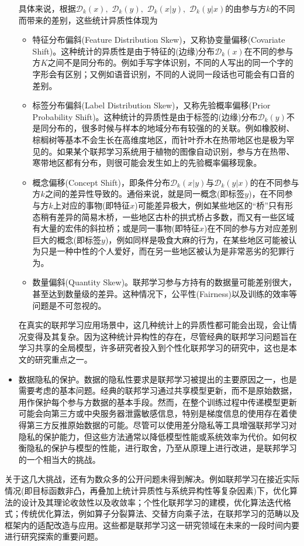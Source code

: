 \begin{itemize}
具体来说，根据$\mathcal{D}_k(x),$ $\mathcal{D}_k(y),$ $\mathcal{D}_k(x | y),$ $\mathcal{D}_k(y | x)$的由参与方$k$的不同而带来的差别，这些统计异质性体现为
\begin{itemize}
    \item 特征分布偏斜(Feature Distribution Skew)，又称协变量偏移(Covariate Shift)。这种统计的异质性是由于特征的(边缘)分布$\mathcal{D}_k(x)$在不同的参与方$K$之间不是同分布的。例如手写字体识别，不同的人写出的同一个字的字形会有区别；又例如语音识别，不同的人说同一段话也可能会有口音的差别。
    \item 标签分布偏斜(Label Distribution Skew)，又称先验概率偏移(Prior Probability Shift)。这种统计的异质性是由于标签的(边缘)分布$\mathcal{D}_k(y)$不是同分布的，很多时候与样本的地域分布有较强的的关联。例如橡胶树、棕榈树等基本不会生长在高维度地区，而针叶乔木在热带地区也是极为罕见的。如果某个联邦学习系统用于植物的图像自动识别，参与方在热带、寒带地区都有分布，则很可能会发生如上的先验概率偏移现象。
    \item 概念偏移(Concept Shift)，即条件分布$\mathcal{D}_k(x | y)$与$\mathcal{D}_k(y | x)$的在不同参与方$k$之间的差异性导致的。通俗来说，就是同一概念(即标签$y$)，在不同参与方$k$上对应的事物(即特征$x$)可能差异极大，例如某些地区的``桥''只有形态稍有差异的简易木桥，一些地区古朴的拱式桥占多数，而又有一些区域有大量的宏伟的斜拉桥；或是同一事物(即特征$x$)在不同的参与方对应差别巨大的概念(即标签$y$)，例如同样是吸食大麻的行为，在某些地区可能被认为只是一种中性的个人爱好，而在另一些地区被认为是非常恶劣的犯罪行为。
    \item 数量偏斜(Quantity Skew)。联邦学习参与方持有的数据量可能差别很大，甚至达到数量级的差异。这种情况下，公平性(Fairness)以及训练的效率等问题是不可忽视的。
\end{itemize}
在真实的联邦学习应用场景中，这几种统计上的异质性都可能会出现，会让情况变得及其复杂。因为这种统计异构性的存在，尽管经典的联邦学习问题旨在学习共享的全局模型，许多研究者投入到个性化联邦学习的研究中，这也是本文的研究重点之一。
\item 数据隐私的保护。数据的隐私性要求是联邦学习被提出的主要原因之一，也是需要考虑的基本问题。经典的联邦学习通过共享模型更新，而不是原始数据，用作保护每个参与方数据的基本手段。然而，在整个训练过程中传递模型更新可能会向第三方或中央服务器泄露敏感信息，特别是梯度信息的使用存在着使得第三方反推原始数据的可能\cite{zhu2019deep_leakage}。尽管可以使用差分隐私\cite{Dwork_2008_DP}等工具增强联邦学习对隐私的保护能力，但这些方法通常以降低模型性能或系统效率为代价。如何权衡隐私的保护与模型的性能，进行取舍，乃至从原理上进行改进，是联邦学习的一个相当大的挑战。
\end{itemize}

关于这几大挑战，还有为数众多的公开问题未得到解决。例如联邦学习在接近实际情况(即目标函数非凸，再叠加上统计异质性与系统异构性等复杂因素)下，优化算法的设计及其理论收敛性以及收敛率；个性化联邦学习的建模，优化算法迭代格式；传统优化算法，例如算子分裂算法、交替方向乘子法，在联邦学习的范畴以及框架内的适配改造与应用。这些都是联邦学习这一研究领域在未来的一段时间内要进行研究探索的重要问题。
